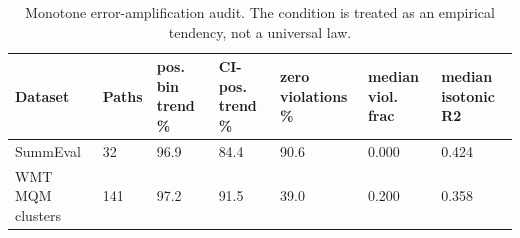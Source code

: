 \begin{table}[t]
\centering
\small
\begin{tabular}{lllllll}
\toprule
Dataset & Paths & pos. bin trend \% & CI-pos. trend \% & zero violations \% & median viol. frac & median isotonic R2 \\
\midrule
SummEval & 32 & 96.9 & 84.4 & 90.6 & 0.000 & 0.424 \\
WMT MQM clusters & 141 & 97.2 & 91.5 & 39.0 & 0.200 & 0.358 \\
\bottomrule
\end{tabular}
\vspace{0.25em}
\caption{Monotone error-amplification audit. The condition is treated as an empirical tendency, not a universal law.}
\label{tab:monotone-audit}
\end{table}
